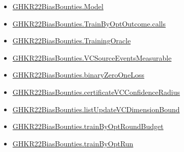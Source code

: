 \documentclass[10pt]{article}
\begin{document}
\begin{itemize}
\item \hyperlink{paper-prerequisite-333127605c12eba8}{GHKR22\allowbreak{}Bias\allowbreak{}Bounties.\allowbreak{}Model}
\item \hyperlink{governing-declaration-75b2e97bcf9f0d38}{GHKR22\allowbreak{}Bias\allowbreak{}Bounties.\allowbreak{}Train\allowbreak{}By\allowbreak{}Opt\allowbreak{}Outcome.\allowbreak{}calls}
\item \hyperlink{governing-declaration-e07f2849e71306e6}{GHKR22\allowbreak{}Bias\allowbreak{}Bounties.\allowbreak{}Training\allowbreak{}Oracle}
\item \hyperlink{governing-declaration-70b850324b52315e}{GHKR22\allowbreak{}Bias\allowbreak{}Bounties.\allowbreak{}VC\allowbreak{}Source\allowbreak{}Events\allowbreak{}Measurable}
\item \hyperlink{governing-declaration-78e8cb53fdc44c21}{GHKR22\allowbreak{}Bias\allowbreak{}Bounties.\allowbreak{}binary\allowbreak{}Zero\allowbreak{}One\allowbreak{}Loss}
\item \hyperlink{governing-declaration-a9ee489a4bd5beb4}{GHKR22\allowbreak{}Bias\allowbreak{}Bounties.\allowbreak{}certificate\allowbreak{}VC\allowbreak{}Confidence\allowbreak{}Radius}
\item \hyperlink{governing-declaration-e0b760fa5e801b6c}{GHKR22\allowbreak{}Bias\allowbreak{}Bounties.\allowbreak{}list\allowbreak{}Update\allowbreak{}VC\allowbreak{}Dimension\allowbreak{}Bound}
\item \hyperlink{governing-declaration-3831ed510715db8d}{GHKR22\allowbreak{}Bias\allowbreak{}Bounties.\allowbreak{}train\allowbreak{}By\allowbreak{}Opt\allowbreak{}Round\allowbreak{}Budget}
\item \hyperlink{paper-prerequisite-07b48266bf86505a}{GHKR22\allowbreak{}Bias\allowbreak{}Bounties.\allowbreak{}train\allowbreak{}By\allowbreak{}Opt\allowbreak{}Run}
\end{itemize}
\end{document}
